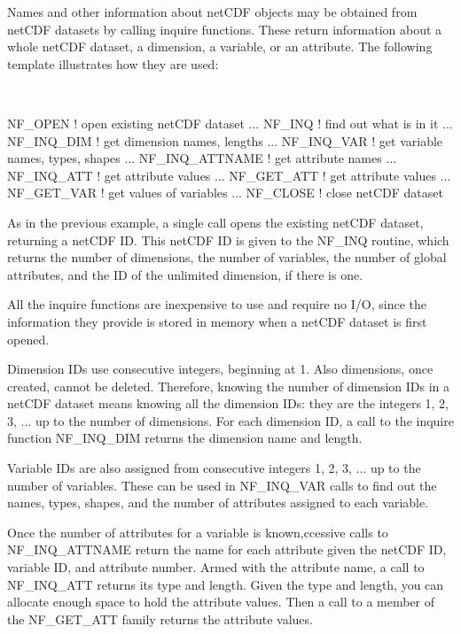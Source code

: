 Names and other information about net\+C\+DF objects may be obtained from net\+C\+DF datasets by calling inquire functions. These return information about a whole net\+C\+DF dataset, a dimension, a variable, or an attribute. The following template illustrates how they are used\+:

 

\begin{DoxyVerb}NF_OPEN                   ! open existing netCDF dataset
  ...
NF_INQ                    ! find out what is in it
     ...
   NF_INQ_DIM             ! get dimension names, lengths
     ...
   NF_INQ_VAR             ! get variable names, types, shapes
        ...
      NF_INQ_ATTNAME      ! get attribute names
        ...
      NF_INQ_ATT          ! get attribute values
        ...
      NF_GET_ATT          ! get attribute values
        ...
   NF_GET_VAR             ! get values of variables
     ...
NF_CLOSE                  ! close netCDF dataset
\end{DoxyVerb}


As in the previous example, a single call opens the existing net\+C\+DF dataset, returning a net\+C\+DF ID. This net\+C\+DF ID is given to the N\+F\+\_\+\+I\+NQ routine, which returns the number of dimensions, the number of variables, the number of global attributes, and the ID of the unlimited dimension, if there is one.

All the inquire functions are inexpensive to use and require no I/O, since the information they provide is stored in memory when a net\+C\+DF dataset is first opened.

Dimension I\+Ds use consecutive integers, beginning at 1. Also dimensions, once created, cannot be deleted. Therefore, knowing the number of dimension I\+Ds in a net\+C\+DF dataset means knowing all the dimension I\+Ds\+: they are the integers 1, 2, 3, ... up to the number of dimensions. For each dimension ID, a call to the inquire function N\+F\+\_\+\+I\+N\+Q\+\_\+\+D\+IM returns the dimension name and length.

Variable I\+Ds are also assigned from consecutive integers 1, 2, 3, ... up to the number of variables. These can be used in N\+F\+\_\+\+I\+N\+Q\+\_\+\+V\+AR calls to find out the names, types, shapes, and the number of attributes assigned to each variable.

Once the number of attributes for a variable is known,ccessive calls to N\+F\+\_\+\+I\+N\+Q\+\_\+\+A\+T\+T\+N\+A\+ME return the name for each attribute given the net\+C\+DF ID, variable ID, and attribute number. Armed with the attribute name, a call to N\+F\+\_\+\+I\+N\+Q\+\_\+\+A\+TT returns its type and length. Given the type and length, you can allocate enough space to hold the attribute values. Then a call to a member of the N\+F\+\_\+\+G\+E\+T\+\_\+\+A\+TT family returns the attribute values.

